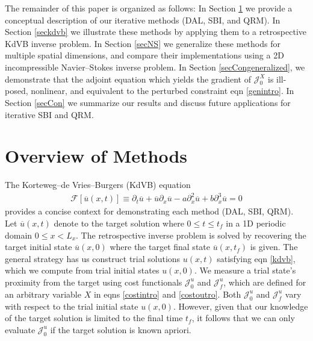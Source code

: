 \documentclass[%
 reprint,
 amsmath,amssymb,
 aps,
 pre,
]{revtex4-2}
\newcommand{\J}{\mathcal{J}}
\newcommand{\Juo}{\mathcal{J}^{u}_0}
\newcommand{\Juf}{\mathcal{J}^{u}_f}
\begin{document}
The remainder of this paper is organized as follows:
In Section \ref{secmethods} we provide a conceptual description of our iterative methods (DAL, SBI, and QRM).
In Section \ref{seckdvb} we illustrate these methods by applying them to a retrospective KdVB inverse problem. 
In Section \ref{secNS} we generalize these methods for multiple spatial dimensions, and compare their implementations using a 2D incompressible Navier--Stokes inverse problem.
In Section \ref{secCongeneralized}, we demonstrate that the adjoint equation which yields the gradient of $\J_0^X$ is ill-posed, nonlinear, and equivalent to the perturbed constraint eqn \ref{genintro}. 
In Section \ref{secCon} we summarize our results and discuss future applications for iterative SBI and QRM.


\section{Overview of Methods}\label{secmethods}

The Korteweg--de Vries--Burgers (KdVB) equation 
\begin{align}
  \mathcal{F}[\overline{u}(x,t)] \equiv \partial_t \overline{u} + \overline{u}\partial_x \overline{u} - a\partial_x^2 \overline{u} + b\partial_x^3 \overline{u} = 0 \label{kdvb}
\end{align}
provides a concise context for demonstrating each method (DAL, SBI, QRM).
Let $\overline{u}(x,t)$ denote to the target solution where $0\leq t\leq t_f$ in a 1D periodic domain $0 \leq x<L_x$.
The retrospective inverse problem is solved by recovering the target initial state $\overline{u}(x,0)$ where the target final state $\overline{u}(x,t_f)$ is given.
The general strategy has us construct trial solutions $u(x,t)$ satisfying eqn \ref{kdvb}, which we compute from trial initial states $u(x,0)$.
We measure a trial state's proximity from the target using cost functionals $\Juo$ and $\Juf$, which are defined for an arbitrary variable $X$ in eqns \ref{costintro} and \ref{costoutro}.
Both $\Juo$ and $\Juf$ vary with respect to the trial initial state $u(x,0)$.
However, given that our knowledge of the target solution is limited to the final time $t_f$, it follows that we can only evaluate $\Juo$ if the target solution is known apriori.
\end{document}

